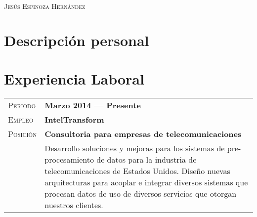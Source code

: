\documentclass[letter, oneside, final]{scrartcl} %
\newcommand{\gray}{\rowcolor[gray]{.90}} %
\begin{document}
\begin{center} %


{\fontsize{26}{26}\selectfont\scshape Jes\'us Espinoza Hern\'andez} %

\vspace{1.5cm} %


\section{Descripci\'on personal}




\section{Experiencia Laboral}

\begin{tabularx}{0.97\linewidth}{>{\raggedleft\scshape}p{2cm}X}
\gray Periodo & \textbf{Marzo 2014 --- Presente}\\
\gray Empleo & \textbf{IntelTransform}\\
\gray Posición & \textbf{Consultoria para empresas de telecomunicaciones}\\
& Desarrollo soluciones y mejoras para los sistemas de pre-procesamiento de datos para la industria de telecomunicaciones de Estados Unidos. Dise\~no nuevas arquitecturas para acoplar e integrar diversos sistemas que procesan datos de uso de diversos servicios que otorgan nuestros clientes.
\end{tabularx}


\end{center}
\end{document}
